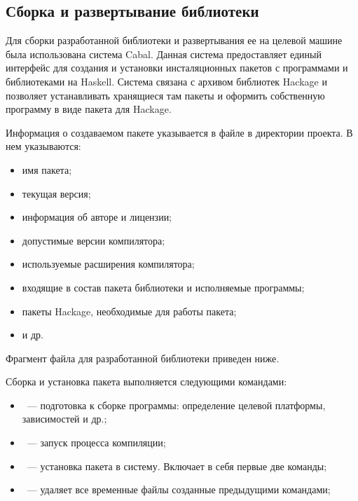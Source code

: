 \subsection{Сборка и развертывание библиотеки}

Для сборки разработанной библиотеки и развертывания ее на целевой машине была использована система Cabal. Данная система предоставляет единый интерфейс для создания и установки инсталяционных пакетов с программами и библиотеками на Haskell. Система связана с архивом библиотек Hackage и позволяет устанавливать хранящиеся там пакеты и оформить собственную программу в виде пакета для Hackage.

Информация о создаваемом пакете указывается в файле  в директории проекта. В нем указываются:
    
\begin{itemize}
\item имя пакета;

\item текущая версия;

\item информация об авторе и лицензии;

\item допустимые версии компилятора;

\item используемые расширения компилятора;

\item входящие в состав пакета библиотеки и исполняемые программы;

\item пакеты Hackage, необходимые для работы пакета;

\item и др.

\end{itemize}
    
    
Фрагмент файла  для разработанной библиотеки приведен ниже.



Сборка и установка пакета выполняется следующими командами:

\begin{itemize}
\item {}~--- подготовка к сборке программы: определение целевой платформы, зависимостей и др.;

\item {}~--- запуск процесса компиляции;

\item {}~--- установка пакета в систему. Включает в себя первые две команды;

\item {}~--- удаляет все временные файлы созданные предыдущими командами;

\end{itemize}
    
